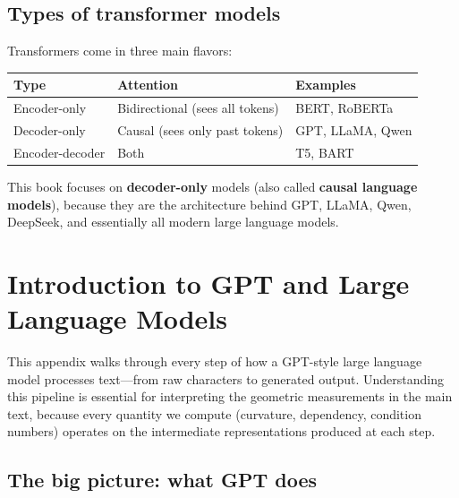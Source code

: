\documentclass[11pt, twoside, openright]{memoir}
\begin{document}
\section{Types of transformer models}

Transformers come in three main flavors:

\begin{center}\small
\begin{tabular}{@{}lll@{}}
\toprule
\textbf{Type} & \textbf{Attention} & \textbf{Examples} \\
\midrule
Encoder-only & Bidirectional (sees all tokens) & BERT, RoBERTa \\
Decoder-only & Causal (sees only past tokens) & GPT, LLaMA, Qwen \\
Encoder-decoder & Both & T5, BART \\
\bottomrule
\end{tabular}
\end{center}

This book focuses on \textbf{decoder-only} models (also called
\textbf{causal language models}), because they are the architecture behind
GPT, LLaMA, Qwen, DeepSeek, and essentially all modern large language models.


\chapter{Introduction to GPT and Large Language Models}
\label{app:gpt-llm}


This appendix walks through every step of how a GPT-style large language
model processes text---from raw characters to generated output.
Understanding this pipeline is essential for interpreting the geometric
measurements in the main text, because every quantity we compute
(curvature, dependency, condition numbers) operates on the intermediate
representations produced at each step.

\section{The big picture: what GPT does}
\end{document}

